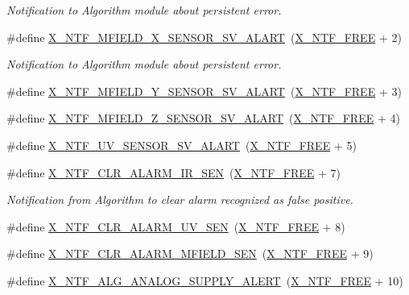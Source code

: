 \begin{DoxyCompactItemize}
\begin{DoxyCompactList}\small\item\em Notification to Algorithm module about persistent error. \end{DoxyCompactList}\item 
\#define \hyperlink{a00021_a9d9558fb2155bafac3683d00b2a18b3f}{X\+\_\+\+N\+T\+F\+\_\+\+M\+F\+I\+E\+L\+D\+\_\+\+X\+\_\+\+S\+E\+N\+S\+O\+R\+\_\+\+S\+V\+\_\+\+A\+L\+A\+R\+T}~(\hyperlink{a00036_ab2eeea4643823a0c7c7731ddb83e3edc}{X\+\_\+\+N\+T\+F\+\_\+\+F\+R\+E\+E} + 2)
\begin{DoxyCompactList}\small\item\em Notification to Algorithm module about persistent error. \end{DoxyCompactList}\item 
\#define \hyperlink{a00021_ad30200601c6761f2c9be1fd62df00421}{X\+\_\+\+N\+T\+F\+\_\+\+M\+F\+I\+E\+L\+D\+\_\+\+Y\+\_\+\+S\+E\+N\+S\+O\+R\+\_\+\+S\+V\+\_\+\+A\+L\+A\+R\+T}~(\hyperlink{a00036_ab2eeea4643823a0c7c7731ddb83e3edc}{X\+\_\+\+N\+T\+F\+\_\+\+F\+R\+E\+E} + 3)
\item 
\#define \hyperlink{a00021_aa1f79c63c45b8a4022e580c676d95627}{X\+\_\+\+N\+T\+F\+\_\+\+M\+F\+I\+E\+L\+D\+\_\+\+Z\+\_\+\+S\+E\+N\+S\+O\+R\+\_\+\+S\+V\+\_\+\+A\+L\+A\+R\+T}~(\hyperlink{a00036_ab2eeea4643823a0c7c7731ddb83e3edc}{X\+\_\+\+N\+T\+F\+\_\+\+F\+R\+E\+E} + 4)
\item 
\#define \hyperlink{a00021_a146527c519502db561ac17015bf9df5b}{X\+\_\+\+N\+T\+F\+\_\+\+U\+V\+\_\+\+S\+E\+N\+S\+O\+R\+\_\+\+S\+V\+\_\+\+A\+L\+A\+R\+T}~(\hyperlink{a00036_ab2eeea4643823a0c7c7731ddb83e3edc}{X\+\_\+\+N\+T\+F\+\_\+\+F\+R\+E\+E} + 5)
\item 
\#define \hyperlink{a00021_a55be0f14bd98010fdd4ff546f8cffefd}{X\+\_\+\+N\+T\+F\+\_\+\+C\+L\+R\+\_\+\+A\+L\+A\+R\+M\+\_\+\+I\+R\+\_\+\+S\+E\+N}~(\hyperlink{a00036_ab2eeea4643823a0c7c7731ddb83e3edc}{X\+\_\+\+N\+T\+F\+\_\+\+F\+R\+E\+E} + 7)
\begin{DoxyCompactList}\small\item\em Notification from Algorithm to clear alarm recognized as false positive. \end{DoxyCompactList}\item 
\#define \hyperlink{a00021_a1127762abb3a1aeb79d23421b2f00493}{X\+\_\+\+N\+T\+F\+\_\+\+C\+L\+R\+\_\+\+A\+L\+A\+R\+M\+\_\+\+U\+V\+\_\+\+S\+E\+N}~(\hyperlink{a00036_ab2eeea4643823a0c7c7731ddb83e3edc}{X\+\_\+\+N\+T\+F\+\_\+\+F\+R\+E\+E} + 8)
\item 
\#define \hyperlink{a00021_af3da43bd9d885f9c2a69ece8f997891b}{X\+\_\+\+N\+T\+F\+\_\+\+C\+L\+R\+\_\+\+A\+L\+A\+R\+M\+\_\+\+M\+F\+I\+E\+L\+D\+\_\+\+S\+E\+N}~(\hyperlink{a00036_ab2eeea4643823a0c7c7731ddb83e3edc}{X\+\_\+\+N\+T\+F\+\_\+\+F\+R\+E\+E} + 9)
\item 
\#define \hyperlink{a00021_a5c8025c00c22190bf4b4c4fe87123f55}{X\+\_\+\+N\+T\+F\+\_\+\+A\+L\+G\+\_\+\+A\+N\+A\+L\+O\+G\+\_\+\+S\+U\+P\+P\+L\+Y\+\_\+\+A\+L\+E\+R\+T}~(\hyperlink{a00036_ab2eeea4643823a0c7c7731ddb83e3edc}{X\+\_\+\+N\+T\+F\+\_\+\+F\+R\+E\+E} + 10)
\end{DoxyCompactItemize}
